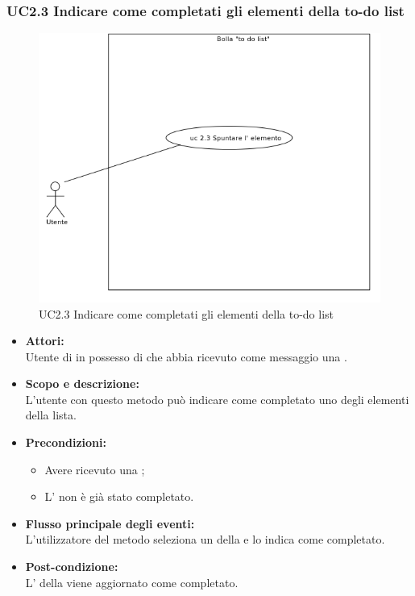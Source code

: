\subsubsection{UC2.3 Indicare come completati gli elementi della to-do list} \label{UC2.3}

\begin{figure}[H]
	\centering
	\includegraphics[width=15cm]{../../documenti/AnalisiDeiRequisiti/Diagrammi_img/uc2_3.png}
	\caption{UC2.3 Indicare come completati gli elementi della to-do list}
\end{figure}

\begin{itemize}
	\item \textbf{Attori:}
	\\Utente di  in possesso di \ProjectName{} che abbia ricevuto come messaggio una  .
	\item \textbf{Scopo e descrizione:} 
	\\L'utente con questo metodo può indicare come completato uno degli elementi della lista.
	\item \textbf{Precondizioni:}
	\begin{itemize}
		\item Avere ricevuto una  ;
		\item L' non è già stato completato.
	\end{itemize}
	\item \textbf{Flusso principale degli eventi:}
	\\L'utilizzatore del metodo seleziona un  della  e lo indica come completato. 
	\item \textbf{Post-condizione:}
	\\L' della  viene aggiornato come completato.
\end{itemize}

